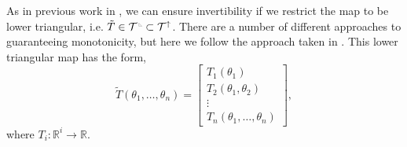 \documentclass[final]{siamltex}
\newcommand{\edit}[1]{#1}
\newcommand{\ltri}{%
\,\resizebox{!}{0.25\baselineskip}{%
\begin{tikzpicture}%
\draw[line width=1mm](0,0) -- (0,2) -- (2,0)  -- (0,0);
\end{tikzpicture}%
}\xspace%
}%
\begin{document}
As in previous work in \cite{parno2018transport}, we can ensure
invertibility if we restrict the map to be \edit{lower triangular\cite{bogachev2005triangular}}, i.e. $\tilde{T} \in \mathcal{T}^{\ltri}\subset\mathcal{T}^\uparrow$. \edit{There are a number of different
  approaches to guaranteeing monotonicity\cite{y.17:_handb_uncer_quant}, but here we follow
  the approach taken in \cite{parno2018transport}.} This lower triangular map has the form,
\begin{equation}
	\tilde{T}(\theta_1, \dots, \theta_n) = \begin{bmatrix} T_1(\theta_1) \\ T_2(\theta_1, \theta_2) \\ \vdots \\
		T_n(\theta_1, \dots, \theta_n) \end{bmatrix},
\end{equation}
where $T_i\colon \mathbb{R}^i \to \mathbb{R}$. %
\end{document}
